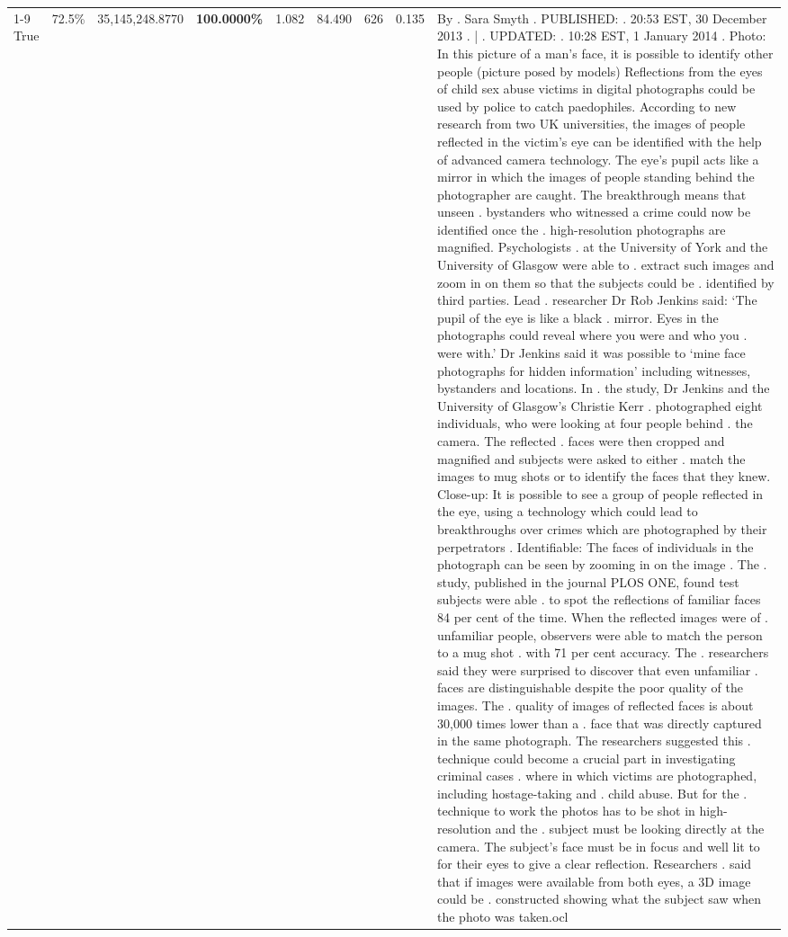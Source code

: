 \begin{table}[H]
\begin{tabular}{lllrlllll}
\cline{1-9} \cline{2-9}
True & 72.5\% & 35,145,248.8770 & \bfseries \color{red} 100.0000\% & 1.082 & 84.490 & 626 & 0.135 & By . Sara Smyth . PUBLISHED: . 20:53 EST, 30 December 2013 . | . UPDATED: . 10:28 EST, 1 January 2014 . Photo: In this picture of a man's face, it is possible to identify other people (picture posed by models) Reflections from the eyes of child sex abuse victims in digital photographs could be used by police to catch paedophiles. According to new research from two UK universities, the images of people reflected in the victim's eye can be identified with the help of advanced camera technology. The eye's pupil acts like a mirror in which the images of people standing behind the photographer are caught. The breakthrough means that unseen . bystanders who witnessed a crime could now be identified once the . high-resolution photographs are magnified. Psychologists . at the University of York and the University of Glasgow were able to . extract such images and zoom in on them so that the subjects could be . identified by third parties. Lead . researcher Dr Rob Jenkins said: ‘The pupil of the eye is like a black . mirror. Eyes in the photographs could reveal where you were and who you . were with.' Dr Jenkins said it was possible to ‘mine face photographs for hidden information' including witnesses, bystanders and locations. In . the study, Dr Jenkins and the University of Glasgow's Christie Kerr . photographed eight individuals, who were looking at four people behind . the camera. The reflected . faces were then cropped and magnified and subjects were asked to either . match the images to mug shots or to identify the faces that they knew. Close-up: It is possible to see a group of people reflected in the eye, using a technology which could lead to breakthroughs over crimes which are photographed by their perpetrators . Identifiable: The faces of individuals in the photograph can be seen by zooming in on the image . The . study, published in the journal PLOS ONE, found test subjects were able . to spot the reflections of familiar faces 84 per cent of the time. When the reflected images were of . unfamiliar people, observers were able to match the person to a mug shot . with 71 per cent accuracy. The . researchers said they were surprised to discover that even unfamiliar . faces are distinguishable despite the poor quality of the images. The . quality of images of reflected faces is about 30,000 times lower than a . face that was directly captured in the same photograph. The researchers suggested this . technique could become a crucial part in investigating criminal cases . where in which victims are photographed, including hostage-taking and . child abuse. But for the . technique to work the photos has to be shot in high-resolution and the . subject must be looking directly at the camera. The subject's face must be in focus and well lit to for their eyes to give a clear reflection. Researchers . said that if images were available from both eyes, a 3D image could be . constructed showing what the subject saw when the photo was taken.ocl \\

\end{tabular}
\end{table}
